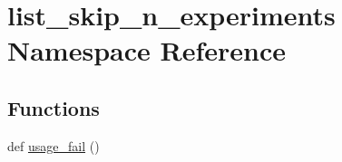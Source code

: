 \hypertarget{namespacelist__skip__n__experiments}{}\section{list\+\_\+skip\+\_\+n\+\_\+experiments Namespace Reference}
\label{namespacelist__skip__n__experiments}
\subsection*{Functions}
\begin{DoxyCompactItemize}
\item 
def \hyperlink{namespacelist__skip__n__experiments_adbf12c996ca2ec1b450d3cefe10ab0c5}{usage\+\_\+fail} ()
\end{DoxyCompactItemize}
